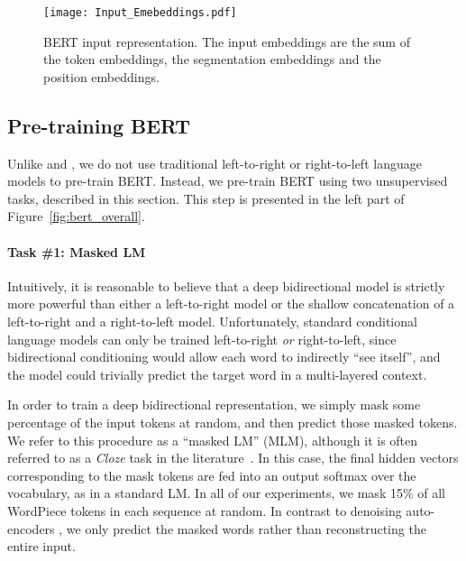 \documentclass[11pt,a4paper]{article}
\begin{document}
\begin{figure*}[ht]
\begin{center}
\hspace{-0.2in}
\texttt{[image: Input\_Emebeddings.pdf]}
\end{center}
\caption{BERT input representation. The input embeddings are the sum of the token embeddings, the segmentation embeddings and the position embeddings.}
\label{fig:input_embeddings}
\end{figure*}





\subsection{Pre-training BERT}
\label{sec:pretraining_tasks}

Unlike \citet{peters-etal:2018:_deep} and \citet{radford-etal:2018}, we do not use traditional left-to-right or right-to-left language models to pre-train BERT. Instead, we pre-train BERT using two unsupervised tasks, described in this section. This step
is presented in the left part of Figure~\ref{fig:bert_overall}.

\paragraph{Task \#1: Masked LM}
Intuitively, it is reasonable to believe that a deep bidirectional model is strictly more powerful than either a left-to-right model or the shallow concatenation of a left-to-right and a right-to-left model. Unfortunately, standard conditional language models can only be trained left-to-right {\it or} right-to-left, since bidirectional conditioning would 
allow each word to indirectly ``see itself'', and
the model could trivially predict the target word in a multi-layered context.

In order to train a deep bidirectional representation, we simply mask some percentage of the input tokens at random, and then predict those masked tokens. We refer to this procedure as a ``masked LM'' (MLM), although it is often referred to as a {\it Cloze} task in the literature~\cite{taylor:1953:_cloze}. In this case, the final hidden vectors corresponding to the mask tokens are fed into an output softmax over the vocabulary, as in a standard LM. In all of our experiments, we mask 15\% of all WordPiece tokens in each sequence at random. In contrast to denoising auto-encoders \cite{vincent:2008}, we only predict the masked words rather than reconstructing the entire input.  
\end{document}
